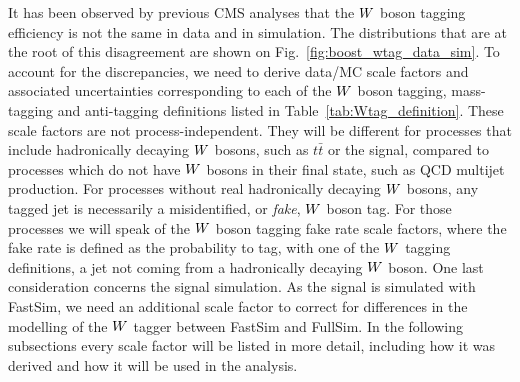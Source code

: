 It has been observed by previous CMS analyses that the $W$ boson tagging efficiency is not the same
in data and in simulation. The distributions that are at the root of this disagreement are shown on
Fig.~\ref{fig:boost_wtag_data_sim}. 
To account for the discrepancies, we need to derive data/MC scale factors and associated
uncertainties corresponding to each of the $W$ boson tagging, mass-tagging and anti-tagging
definitions listed in Table~\ref{tab:Wtag_definition}. These scale factors are not
process-independent. They will be different for processes that include hadronically decaying $W$
bosons, such as $t\bar{t}$ or the signal, compared to processes which do not have $W$ bosons in
their final state, such as QCD multijet production. For processes without real hadronically
decaying $W$ bosons, any tagged jet is necessarily a misidentified, or \textit{fake}, $W$ boson
tag. For those processes we will speak of the $W$ boson tagging fake rate scale factors, where the
fake rate is defined as the probability to tag, with one of the $W$ tagging definitions, a jet
not coming from a hadronically decaying $W$ boson. 
One last consideration concerns the signal simulation. As the signal is simulated with FastSim, we
need an additional scale factor to correct for differences in the modelling of the $W$ tagger
between FastSim and FullSim. 
In the following subsections every scale factor will be listed in more detail, including how it was
derived and how it will be used in the analysis. 

